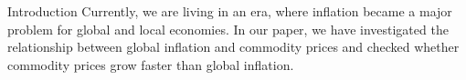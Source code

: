 \begin{frame}{Introduction}
   Currently, we are living in an era, where inflation became a major problem for
global and local economies. In our paper, we have investigated the relationship
between global inflation and commodity prices and checked whether commodity
prices grow faster than global inflation.
\end{frame}